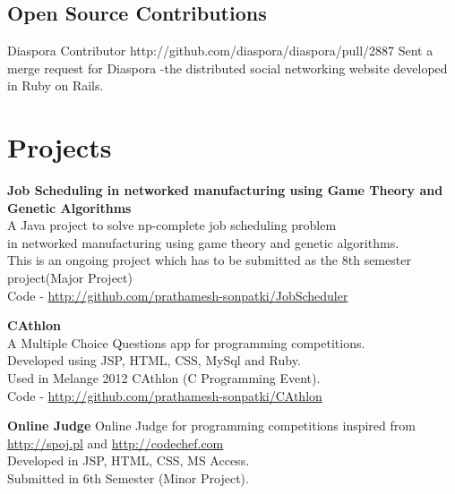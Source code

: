 \documentclass[11pt,a4paper]{moderncv}
\begin{document}
\subsection{Open Source Contributions}

\cventry
         {}
         {Diaspora}
         {Contributor}
         {}
         {http://github.com/diaspora/diaspora/pull/2887}
         {
          Sent a merge request for Diaspora -the distributed social
          networking website developed in Ruby on Rails. }



\section{Projects}

\cvlistitem
{\textbf
        {
         Job Scheduling in networked manufacturing using Game Theory
         and Genetic Algorithms
        }   
      \\A Java project to solve np-complete job scheduling problem \\
      in networked manufacturing using game theory and genetic algorithms.\\
      This is an ongoing project which has to be submitted as the 8th
      semester project(Major Project) \\
      Code - \url{http://github.com/prathamesh-sonpatki/JobScheduler}
}

\cvlistitem
{\textbf
      {CAthlon}  
      \\A Multiple Choice Questions app for programming competitions.\\
      Developed using JSP, HTML, CSS, MySql and Ruby.\\
      Used in Melange 2012 CAthlon (C Programming Event). \\
      Code - \url{http://github.com/prathamesh-sonpatki/CAthlon}
}


\cvlistitem
{\textbf{Online Judge} 
    Online Judge for programming competitions inspired from \url{http://spoj.pl} 
    and \url{http://codechef.com}\\
    Developed in JSP, HTML, CSS, MS Access. \\
    Submitted in 6th Semester (Minor Project). 
}




\end{document}

